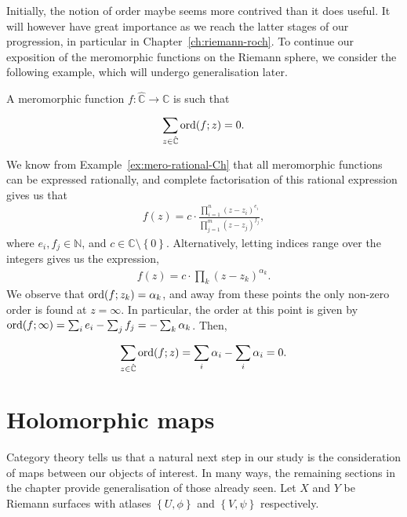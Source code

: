 Initially, the notion of order maybe seems more contrived than it does useful.
It will however have great importance as we reach the latter stages of our
progression, in particular in Chapter~\ref{ch:riemann-roch}. To continue our
exposition of the meromorphic functions on the Riemann sphere, we consider the
following example, which will
undergo generalisation later.

\begin{example}
	A meromorphic function $ f: \hat{\mathbb{C}} \to \mathbb{C} $ is such that
	\begin{align*}
		\sum_{z \in \hat{\mathbb{C}}}^{}{\operatorname{ord}(f;z)}=0.
	\end{align*}

	We know from Example~\ref{ex:mero-rational-Ch} that all meromorphic functions
	can be expressed rationally, and complete factorisation of this rational
	expression gives us that
	\begin{align*}
		f(z) = c \cdot
		\frac{\prod_{i=1}^{n}{(z-z_i)^{e_i}}}{\prod_{j=1}^{m}{(z-z_j)^{f_j}}},
	\end{align*}
	where $ e_i, f_j \in \mathbb{N} $, and $ c \in \mathbb{C}\setminus \left\{ 0
		\right\} $. Alternatively, letting indices range over the integers gives us
	the expression,
	\begin{align*}
		f(z) = c \cdot \prod_{k}^{}{(z-z_k) ^{\alpha_k}.}
	\end{align*}
	We observe that $ \operatorname{ord}(f;z_k) = \alpha_k $, and away from these points the
	only non-zero order is found at $ z= \infty $. In particular, the order at
	this point is given by $ \operatorname{ord}(f; \infty) = \sum_{i}^{}{e_i}- \sum_{j}^{}{f_j}=
		-\sum_{k}^{}{\alpha_k}$. Then,
	\begin{align*}
		\sum_{z \in \hat{\mathbb{C}}}^{}{\operatorname{ord}(f;z)} = \sum_{i}^{}{\alpha_i}-
		\sum_{i}^{}{\alpha_i}=0.
	\end{align*}
\end{example}

\section{Holomorphic maps}
Category theory tells us that a natural next step in our study is the
consideration of maps between our objects of interest. In many ways, the
remaining sections in the chapter provide generalisation of those already seen.
Let $ X $ and $ Y $ be Riemann surfaces with atlases $ \left\{ U, \phi \right\}
$ and $ \left\{ V, \psi \right\} $ respectively.

